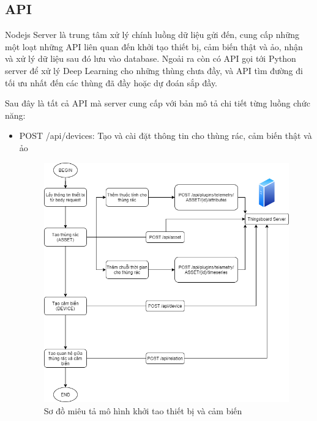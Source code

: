 \subsection{API}
Nodejs Server là trung tâm xử lý chính luồng dữ liệu gửi đến, cung cấp những một loạt những API liên quan đến khởi tạo thiết bị, cảm biến thật và ảo, nhận và xử lý dữ liệu sau đó lưu vào database. Ngoải ra còn có API gọi tới Python server để xử lý Deep Learning cho những thùng chưa đầy, và API tìm đường đi tối ưu nhất đến các thùng đã đầy hoặc dự đoán sắp đầy.

Sau đây là tất cả API mà server cung cấp với bản mô tả chi tiết từng luồng chức năng:
\begin{itemize}
    \item POST /api/devices: Tạo và cài đặt thông tin cho thùng rác, cảm biến thật và ảo
        \begin{itemize}
            \begin{figure}[H]
                \centering
                \includegraphics[width=\textwidth]{images/Khanh/Nodejs/Server_Create_Stimulate_Device.png}
                \caption{Sơ đồ miêu tả mô hình khởi tao thiết bị và cảm biến}

\end{figure}
\end{itemize}
\end{itemize}
